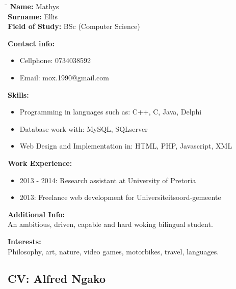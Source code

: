 \documentclass[12pt]{article}
\begin{document}
	\begin{flushleft}
		\begin{tabbing}
			\hspace*{4cm}\=\hspace*{3cm}\kill
			\textbf{Name:} \> Mathys \\	
			\textbf{Surname:} \> Ellis \\
			\textbf{Field of Study:} \> BSc (Computer Science)
		\end{tabbing}
		
		\textbf{Contact info:}	
		\begin{itemize}
			\item Cellphone: 0734038592
			\item Email: mox.1990@gmail.com
		\end{itemize}
		
	
	
		\textbf{Skills:}
		\begin{itemize}
			\item Programming in languages such as: C++, C, Java, Delphi
			\item Database work with: MySQL, SQLserver
			\item Web Design and Implementation in: HTML, PHP, Javascript, XML
		\end{itemize}
	
		\textbf{Work Experience:}
		\begin{itemize}
			\item 2013 - 2014: Research assistant at University of Pretoria
			\item 2013: Freelance web development for Universiteitsoord-gemeente 
		\end{itemize}
	
		\textbf{Additional Info:} \\
		\vspace{0.1in}
	 	An ambitious, driven, capable and hard woking bilingual student. \\
		\vspace{0.1in}
		
		\textbf{Interests:} \\
		\vspace{0.1in}
	 	Philosophy, art, nature, video games, motorbikes, travel, languages. \\
	 	\vspace{0.1in}
	\end{flushleft}
	
	\newpage
	\subsection{CV: Alfred Ngako}
	
\end{document}
